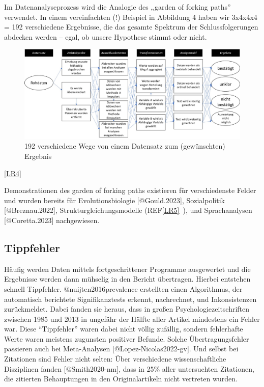 \documentclass[
  letterpaper,
  DIV=11,
  numbers=noendperiod]{scrreprt}
\begin{document}
Im Datenanalyseprozess wird die Analogie des „garden of forking paths''
verwendet. In einem vereinfachten (!) Beispiel in Abbildung 4 haben wir
3x4x4x4 = 192 verschiedene Ergebnisse, die das gesamte Spektrum der
Schlussfolgerungen abdecken werden -- egal, ob unsere Hypothese stimmt
oder nicht.

\begin{figure}[H]

{\centering \includegraphics{images/gardenofforkingpaths.jpg}

}

\caption{192 verschiedene Wege von einem Datensatz zum (gewünschten)
Ergebnis}

\end{figure}%

\hyperref[_msocom_4]{{[}LR4{]}}~

Demonstrationen des garden of forking paths existieren für
verschiedenste Felder und wurden bereits für Evolutionsbiologie
{[}@Gould.2023{]}, Sozialpolitik {[}@Breznau.2022{]},
Strukturgleichungsmodelle (REF\hyperref[_msocom_5]{{[}LR5{]}}~), und
Sprachanalysen {[}@Coretta.2023{]} nachgewiesen.

\subsection{Tippfehler}\label{tippfehler}

Häufig werden Daten mittels fortgeschrittener Programme ausgewertet und
die Ergebnisse werden dann mühselig in den Bericht übertragen. Hierbei
entstehen schnell Tippfehler. @nuijten2016prevalence erstellten einen
Algorithmus, der automatisch berichtete Signifikanztests erkennt,
nachrechnet, und Inkonsistenzen zurückmeldet. Dabei fanden sie heraus,
dass in großen Psychologiezeitschriften zwischen 1985 und 2013 in
ungefähr der Hälfte aller Artikel mindestens ein Fehler war. Diese
``Tippfehler'' waren dabei nicht völlig zufällig, sondern fehlerhafte
Werte waren meistens zugunsten positiver Befunde. Solche
Übertragungsfehler passieren auch bei Meta-Analysen
{[}@Lopez-Nicolas2022-gv{]}. Und selbst bei Zitationen sind Fehler nicht
selten: Über verschiedene wissenschaftliche Disziplinen fanden
{[}@Smith2020-nm{]}, dass in 25\% aller untersuchten Zitationen, die
zitierten Behauptungen in den Originalartikeln nicht vertreten wurden.
\end{document}
